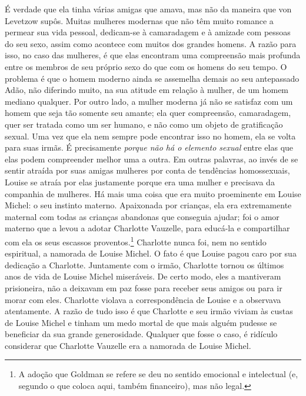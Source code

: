 É verdade que ela tinha várias amigas que amava, mas não da maneira que
von Levetzow supôs. Muitas mulheres modernas que não têm muito romance a
permear sua vida pessoal, dedicam-se à camaradagem e à amizade com
pessoas do seu sexo, assim como acontece com muitos dos grandes homens.
A razão para isso, no caso das mulheres, é que elas encontram uma
compreensão mais profunda entre os membros de seu próprio sexo do que
com os homens do seu tempo. O problema é que o homem moderno ainda se
assemelha demais ao seu antepassado Adão, não diferindo muito, na sua
atitude em relação à mulher, de um homem mediano qualquer. Por outro
lado, a mulher moderna já não se satisfaz com um homem que seja tão
somente seu amante; ela quer compreensão, camaradagem, quer ser tratada
como um ser humano, e não como um objeto de gratificação sexual. Uma vez
que ela nem sempre pode encontrar isso no homem, ela se volta para suas
irmãs. É precisamente \emph{porque não há o elemento sexual} entre elas
que elas podem compreender melhor uma a outra. Em outras palavras, ao
invés de se sentir atraída por suas amigas mulheres por conta de
tendências homossexuais, Louise se atraía por elas justamente porque era
uma mulher e precisava da companhia de mulheres. Há mais uma coisa que
era muito proeminente em Louise Michel: o seu instinto materno.
Apaixonada por crianças, ela era extremamente maternal com todas as
crianças abandonas que conseguia ajudar; foi o amor materno que a levou
a adotar Charlotte Vauzelle, para educá-la e compartilhar com ela os
seus escassos proventos.\footnote{A adoção que Goldman se refere se deu
  no sentido emocional e intelectual (e, segundo o que coloca aqui,
  também financeiro), mas não legal.} Charlotte nunca foi, nem no
sentido espiritual, a namorada de Louise Michel. O fato é que Louise
pagou caro por sua dedicação a Charlotte. Juntamente com o irmão,
Charlotte tornou os últimos anos de vida de Louise Michel miseráveis. De
certo modo, eles a mantiveram prisioneira, não a deixavam em paz fosse
para receber seus amigos ou para ir morar com eles. Charlotte violava a
correspondência de Louise e a observava atentamente. A razão de tudo
isso é que Charlotte e seu irmão viviam às custas de Louise Michel e
tinham um medo mortal de que mais alguém pudesse se beneficiar da sua
grande generosidade. Qualquer que fosse o caso, é ridículo considerar
que Charlotte Vauzelle era a namorada de Louise Michel.

